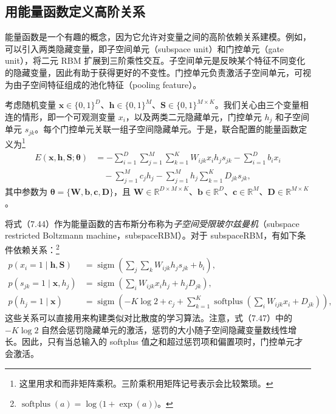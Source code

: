 \subsection{用能量函数定义高阶关系}
能量函数是一个有趣的概念，因为它允许对变量之间的高阶依赖关系建模。例如，可以引入两类隐藏变量，即子空间单元（subspace unit）和门控单元（gate unit），将二元 RBM 扩展到三阶乘性交互。子空间单元是反映某个特征不同变化的隐藏变量，因此有助于获得更好的不变性。门控单元负责激活子空间单元，可视为由子空间特征组成的池化特征（pooling feature）。

考虑随机变量 $\mathbf{x}\in\{0,1\}^{D}$、$\mathbf{h}\in\{0,1\}^{M}$、$\mathbf{S}\in\{0,1\}^{M\times K}$。我们关心由三个变量相连的情形，即一个可观测变量 $x_i$，以及两类二元隐藏单元，门控单元 $h_j$ 和子空间单元 $s_{jk}$。每个门控单元关联一组子空间隐藏单元。于是，联合配置的能量函数定义为\footnote{这里用求和而非矩阵乘积。三阶乘积用矩阵记号表示会比较繁琐。}
\begin{equation}
\begin{aligned}
E(\mathbf{x},\mathbf{h},\mathbf{S};\boldsymbol{\theta})
 &=-\sum_{i=1}^{D}\sum_{j=1}^{M}\sum_{k=1}^{K} W_{ijk}x_ih_js_{jk}
            -\sum_{i=1}^{D}b_ix_i\\
 &\quad-\sum_{j=1}^{M}c_jh_j-\sum_{j=1}^{M}h_j\sum_{k=1}^{K}D_{jk}s_{jk},
\end{aligned}
\tag{7.44}\label{eq:07-44}
\end{equation}
其中参数为 $\boldsymbol{\theta}=\{\mathbf{W},\mathbf{b},\mathbf{c},\mathbf{D}\}$，且 $\mathbf{W}\in\mathbb{R}^{D\times M\times K}$、$\mathbf{b}\in\mathbb{R}^{D}$、$\mathbf{c}\in\mathbb{R}^{M}$、$\mathbf{D}\in\mathbb{R}^{M\times K}$。

将式（7.44）作为能量函数的吉布斯分布称为\emph{子空间受限玻尔兹曼机}（subspace restricted Boltzmann machine，subspaceRBM）。对于 subspaceRBM，有如下条件依赖关系：\footnote{$\operatorname{softplus}(a)=\log\bigl(1+\exp(a)\bigr)$。}
\begin{align}
p(x_i=1\mid\mathbf{h},\mathbf{S})
 &=\operatorname{sigm}\left(\sum_j\sum_k W_{ijk}h_js_{jk}+b_i\right),
          \tag{7.45}\label{eq:07-45}\\
p(s_{jk}=1\mid\mathbf{x},h_j)
 &=\operatorname{sigm}\left(\sum_i W_{ijk}x_ih_j+h_jD_{jk}\right),
          \tag{7.46}\label{eq:07-46}\\
p(h_j=1\mid\mathbf{x})
 &=\operatorname{sigm}\left(-K\log 2+c_j+
    \sum_{k=1}^{K}\operatorname{softplus}\left(\sum_i W_{ijk}x_i+D_{jk}\right)\right),
          \tag{7.47}\label{eq:07-47}
\end{align}
这些关系可以直接用来构建类似对比散度的学习算法。注意，式（7.47）中的 $-K\log 2$ 自然会惩罚隐藏单元的激活，惩罚的大小随子空间隐藏变量数线性增长。因此，只有当总输入的 softplus 值之和超过惩罚项和偏置项时，门控单元才会激活。

